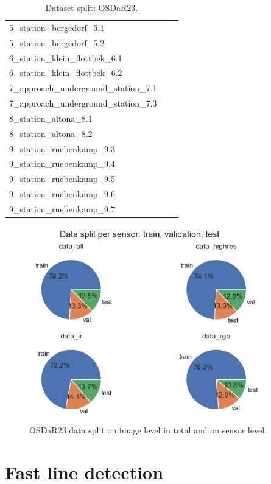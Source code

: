 \documentclass[Master,MDS,english]{BASE/twbook} %
\begin{document}
\begin{table}[H]
\begin{tabular}{|l|l|l|}
5\_station\_bergedorf\_5.1 & & \\
5\_station\_bergedorf\_5.2 & & \\
6\_station\_klein\_flottbek\_6.1 & & \\
6\_station\_klein\_flottbek\_6.2 & & \\
7\_approach\_underground\_station\_7.1 & & \\
7\_approach\_underground\_station\_7.3 & & \\
8\_station\_altona\_8.1 & & \\
8\_station\_altona\_8.2 & & \\
9\_station\_ruebenkamp\_9.3 & & \\
9\_station\_ruebenkamp\_9.4 & & \\
9\_station\_ruebenkamp\_9.5 & & \\
9\_station\_ruebenkamp\_9.6 & & \\
9\_station\_ruebenkamp\_9.7 & & \\
\hline
\end{tabular}
\caption{Dataset split: OSDaR23.}
\label{tab:dataset_split}
\end{table}



\begin{figure}[H]
\centering
\includegraphics[width=0.9\textwidth]{images/datasets/db/data_split}
\caption{OSDaR23 data split on image level in total and on sensor level. }
\label{fig:data_split}
\end{figure}

\section{Fast line detection}  \label{app:fld}
\end{document}

